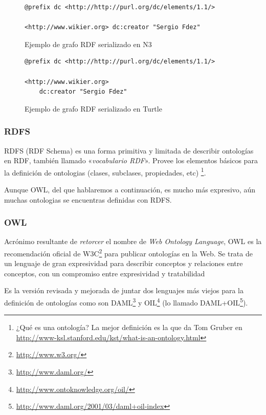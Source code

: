\begin{figure}[H]
\lstset{language=N3}
\begin{lstlisting}
@prefix dc <http://http://purl.org/dc/elements/1.1/>

<http://www.wikier.org> dc:creator "Sergio Fdez"
\end{lstlisting}
\caption{Ejemplo de grafo RDF serializado en N3}
\label{fig:ejemplo.rdfn3}
\end{figure}

\begin{figure}[H]
\lstset{language=Turtle}
\begin{lstlisting}
@prefix dc <http://http://purl.org/dc/elements/1.1/>

<http://www.wikier.org> 
	dc:creator "Sergio Fdez"
\end{lstlisting}
\caption{Ejemplo de grafo RDF serializado en Turtle}
\label{fig:ejemplo.rdfturtle}
\end{figure}

\subsubsection{RDFS}

RDFS (RDF Schema\cite{RDFS}) es una forma primitiva y limitada de describir 
ontologías en RDF, también llamado «\emph{vocabulario RDF}». Provee los elementos
básicos para la definición de ontologias (clases, subclases, propiedades, etc)
\footnote{¿Qué es una ontología? La mejor definición es la que da Tom Gruber
en \url{http://www-ksl.stanford.edu/kst/what-is-an-ontology.html}}.

Aunque OWL, del que hablaremos a continuación, es mucho más expresivo, aún muchas
ontologias se encuentras definidas con RDFS.

\subsubsection{OWL}

Acrónimo resultante de \emph{retorcer} el nombre de 
\emph{Web Ontology Language}, OWL\cite{OWL} es la recomendación 
oficial de W3C\footnote{\url{http://www.w3.org/}} para publicar ontologías en 
la Web. Se trata de un lenguaje de gran expresividad para describir conceptos 
y relaciones entre conceptos, con un compromiso entre expresividad y tratabilidad

Es la versión revisada y mejorada de juntar dos lenguajes más viejos para la 
definición de ontologías como son DAML\footnote{\url{http://www.daml.org/}} y 
OIL\footnote{\url{http://www.ontoknowledge.org/oil/}} (lo llamado
DAML+OIL\footnote{\url{http://www.daml.org/2001/03/daml+oil-index}}).

